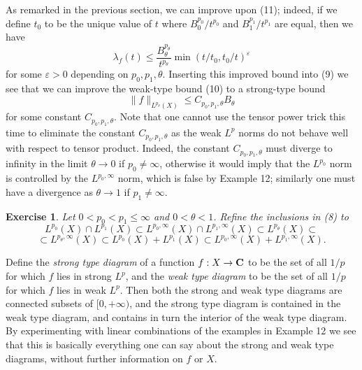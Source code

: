 \documentclass[10pt,reqno]{amsart}
\newtheorem{exercise}[theorem]{Exercise}
\begin{document}
As remarked in the previous section, we can improve upon (11); indeed, if we define $t_0$ to be the unique value of $t$ where $B_0^{p_0} / t^{p_0}$ and $B_1^{p_1}/t^{p_1}$ are equal, then we have
%
\[ \lambda_f(t) \leq \frac{B_\theta^{p_\theta}}{t^{p_\theta}} \min( t/t_0, t_0/t)^\varepsilon\]
%
for some $\varepsilon > 0$ depending on $p_0, p_1, \theta$. Inserting this improved bound into (9) we see that we can improve the weak-type bound (10) to a strong-type bound
%
\begin{equation} \|f\|_{L^{p_\theta}(X)} \leq C_{p_0,p_1,\theta} B_\theta \end{equation}
%
for some constant $C_{p_0,p_1,\theta}$. Note that one cannot use the tensor power trick this time to eliminate the constant $C_{p_0,p_1,\theta}$ as the weak $L^p$ norms do not behave well with respect to tensor product. Indeed, the constant $C_{p_0,p_1,\theta}$ must diverge to infinity in the limit $\theta \rightarrow 0$ if $p_0 \neq \infty$, otherwise it would imply that the $L^{p_0}$ norm is controlled by the $L^{p_0,\infty}$ norm, which is false by Example 12; similarly one must have a divergence as $\theta \rightarrow 1$ if $p_1 \neq \infty$.

\begin{exercise}
    Let $0 < p_0 < p_1 \leq \infty$ and $0 < \theta < 1$. Refine the inclusions in (8) to
    \[     L^{p_0}(X) \cap L^{p_1}(X) \subset L^{p_0,\infty}(X) \cap L^{p_1,\infty}(X) \subset L^{p_\theta}(X) \subset\]
    \[     \subset L^{p_\theta,\infty}(X) \subset L^{p_0}(X) + L^{p_1}(X) \subset L^{p_0,\infty}(X) + L^{p_1,\infty}(X).\]
\end{exercise}

Define the \emph{strong type diagram} of a function $f: X \rightarrow {\bf C}$ to be the set of all $1/p$ for which $f$ lies in strong $L^p$, and the \emph{weak type diagram} to be the set of all $1/p$ for which $f$ lies in weak $L^p$. Then both the strong and weak type diagrams are connected subsets of $[0,+\infty)$, and the strong type diagram is contained in the weak type diagram, and contains in turn the interior of the weak type diagram. By experimenting with linear combinations of the examples in Example 12 we see that this is basically everything one can say about the strong and weak type diagrams, without further information on $f$ or $X$.
\end{document}
